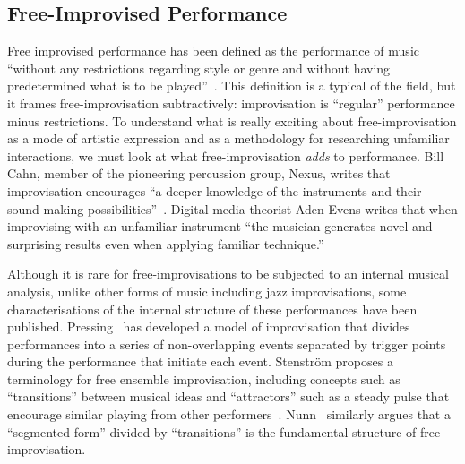\documentclass[graybox]{svmult}
\begin{document}



\subsection{Free-Improvised Performance}
\label{subsec:free-improvisation}

Free improvised performance has been defined as the performance of
music ``without any restrictions regarding style or genre and without
having predetermined what is to be played''~\cite{Stenstrom:2009xy}.
This definition is a typical of the field, but it frames
free-improvisation subtractively: improvisation is ``regular''
performance minus restrictions. To understand what is really exciting
about free-improvisation as a mode of artistic expression and as a
methodology for researching unfamiliar interactions, we must look at
what free-improvisation \emph{adds} to performance. Bill Cahn, member
of the pioneering percussion group, Nexus, writes that improvisation
encourages ``a deeper knowledge of the instruments and their
sound-making possibilities''~\cite{Cahn:2005uq}. Digital media
theorist Aden Evens writes that when improvising with an unfamiliar
instrument ``the musician generates novel and surprising results even
when applying familiar technique.''~\cite{Evens:2005kx}

Although it is rare for free-improvisations to be subjected to an
internal musical analysis, unlike other forms of music including jazz
improvisations, some characterisations of the internal structure of
these performances have been published.
Pressing~\cite{Pressing:1988uo} has developed a model of improvisation
that divides performances into a series of non-overlapping events
separated by trigger points during the performance that initiate each
event. Stenstr\"om proposes a terminology for free ensemble
improvisation, including concepts such as ``transitions'' between
musical ideas and ``attractors'' such as a steady pulse that encourage
similar playing from other performers~\cite{Stenstrom:2009xy}.
Nunn~\cite{Nunn:1998ly} similarly argues that a ``segmented form''
divided by ``transitions'' is the fundamental structure of free
improvisation.
\end{document}

